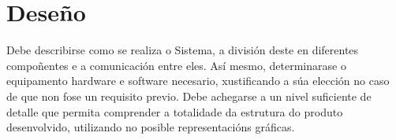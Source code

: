 \chapter{Deseño}

Debe describirse como se realiza o Sistema, a división deste en diferentes compoñentes e a comunicación entre eles. Así mesmo, determinarase o equipamento hardware e software necesario, xustificando a súa elección no caso de que non fose un requisito previo. Debe achegarse a un nivel suficiente de detalle que permita comprender a totalidade da estrutura do produto desenvolvido, utilizando no posible representacións gráficas.